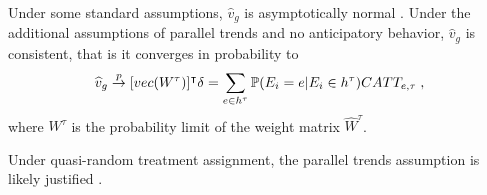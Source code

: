Under some standard assumptions, $\widehat{v}_g$ is asymptotically normal \citep[for a proof and a detailed description of said assumptions see][Appendix C]{Sun_2021}. Under the additional assumptions of parallel trends and no anticipatory behavior, $\widehat{v}_g$ is consistent, that is it converges in probability to
\begin{align*}
	\widehat{v}_g \overset{p}{\to} [vec(W^{\tau})]^\intercal \delta = \sum_{e \in h^{\tau}} \mathbb{P}(E_i = e | E_i \in h^{\tau}) CATT_{e, \tau} \; ,
\end{align*}
where $W^{\tau}$ is the probability limit of the weight matrix $\widehat{W}^\tau$.


Under quasi-random treatment assignment, the parallel trends assumption is likely justified \citep{Roth_2022}. 



